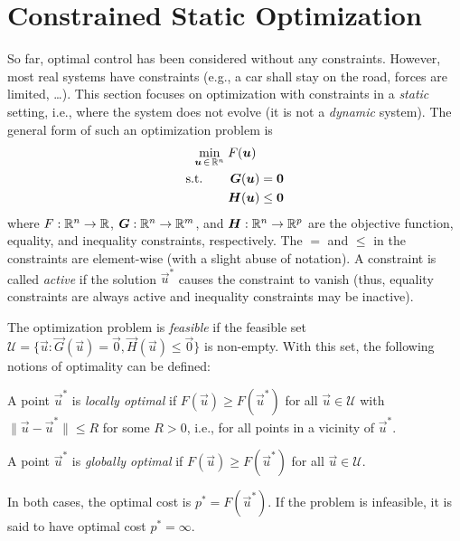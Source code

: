 	\section{Constrained Static Optimization}
		\label{sec:staticOpt}

		So far, optimal control has been considered without any constraints. However, most real systems have constraints (e.g., a car shall stay on the road, forces are limited, \dots). This section focuses on optimization with constraints in a \emph{static} setting, i.e., where the system does not evolve (it is not a \emph{dynamic} system). The general form of such an optimization problem is
		\begin{align}
			\min_{\bm{u} \,\in\, \mathbb{R}^n}\; & F(\bm{u}) \\
			\text{s.t.}\qquad&
			\begin{aligned}[t]
				\bm{G}(\bm{u}) &= \bm{0} \\
				\bm{H}(\bm{u}) &\leq \bm{0}
			\end{aligned}
		\end{align}
		where \( F : \mathbb{R}^n \to \mathbb{R} \), \( \bm{G} : \mathbb{R}^n \to \mathbb{R}^m \), and \( \bm{H} : \mathbb{R}^n \to \mathbb{R}^p \) are the objective function, equality, and inequality constraints, respectively. The \(=\) and \(\leq\) in the constraints are element-wise (with a slight abuse of notation). A constraint is called \emph{active} if the solution \(\vec{u}^\ast\) causes the constraint to vanish (thus, equality constraints are always active and inequality constraints may be inactive).

		The optimization problem is \emph{feasible} if the feasible set \( \mathcal{U} = \{ \vec{u} : \vec{G}(\vec{u}) = \vec{0}, \vec{H}(\vec{u}) \leq \vec{0} \} \) is non-empty. With this set, the following notions of optimality can be defined:
		\begin{definition}
			A point \( \vec{u}^\ast \) is \emph{locally optimal} if \( F(\vec{u}) \geq F(\vec{u}^\ast) \) for all \( \vec{u} \in \mathcal{U} \) with \( \lVert \vec{u} - \vec{u}^\ast \rVert \leq R \) for some \( R > 0 \), i.e., for all points in a vicinity of \(\vec{u}^\ast\).
		\end{definition}
		\begin{definition}
			A point \( \vec{u}^\ast \) is \emph{globally optimal} if \( F(\vec{u}) \geq F(\vec{u}^\ast) \) for all \( \vec{u} \in \mathcal{U} \).
		\end{definition}
		In both cases, the optimal cost is \( p^\ast = F(\vec{u}^\ast) \). If the problem is infeasible, it is said to have optimal cost \( p^\ast = \infty \).

